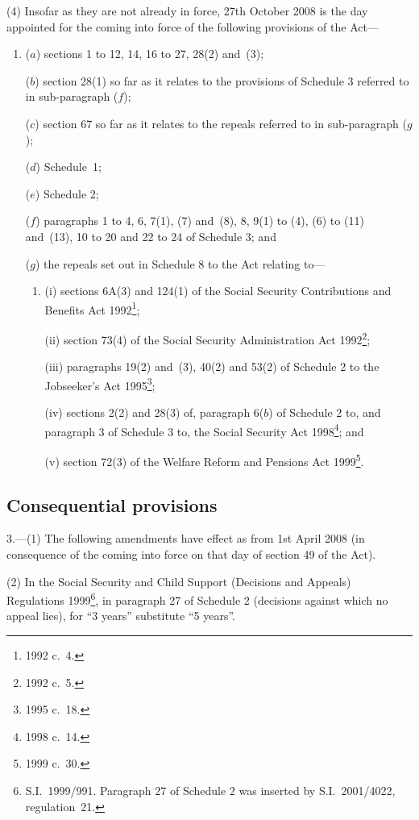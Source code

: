 \documentclass[12pt,a4paper]{article}
\begin{document}
(4) Insofar as they are not already in force, 27th October 2008 is the day appointed for the coming into force of the following provisions of the Act—
\begin{enumerate}\item[]
($a$) sections 1 to 12, 14, 16 to 27, 28(2) and~(3);

($b$) section 28(1) so far as it relates to the provisions of Schedule 3 referred to in sub-paragraph ($f$);

($c$) section 67 so far as it relates to the repeals referred to in sub-paragraph ($g$);

($d$) Schedule~1;

($e$) Schedule 2;

($f$) paragraphs 1 to 4, 6, 7(1), (7) and~(8), 8, 9(1) to (4), (6) to (11) and~(13), 10 to 20 and 22 to 24 of Schedule 3; and

($g$) the repeals set out in Schedule 8 to the Act relating to—
\begin{enumerate}\item[]
(i) sections 6A(3) and 124(1) of the Social Security Contributions and Benefits Act 1992\footnote{1992 c.\ 4.};

(ii) section 73(4) of the Social Security Administration Act 1992\footnote{1992 c.\ 5.};

(iii) paragraphs 19(2) and~(3), 40(2) and 53(2) of Schedule 2 to the Jobseeker’s Act 1995\footnote{1995 c.\ 18.};

(iv) sections 2(2) and 28(3) of, paragraph 6($b$)  of Schedule 2 to, and paragraph 3 of Schedule 3 to, the Social Security Act 1998\footnote{1998 c.\ 14.}; and

(v) section 72(3) of the Welfare Reform and Pensions Act 1999\footnote{1999 c.\ 30.}.
\end{enumerate}
\end{enumerate}

\subsection[3. Consequential provisions]{Consequential provisions}

3.---(1)  The following amendments have effect as from 1st April 2008 (in consequence of the coming into force on that day of section 49 of the Act).

(2) In the Social Security and Child Support (Decisions and Appeals) Regulations 1999\footnote{S.I.\ 1999/991. Paragraph 27 of Schedule 2 was inserted by S.I.\ 2001/4022, regulation~21.}, in paragraph 27 of Schedule 2 (decisions against which no appeal lies), for “3 years” substitute “5 years”.
\end{document}
